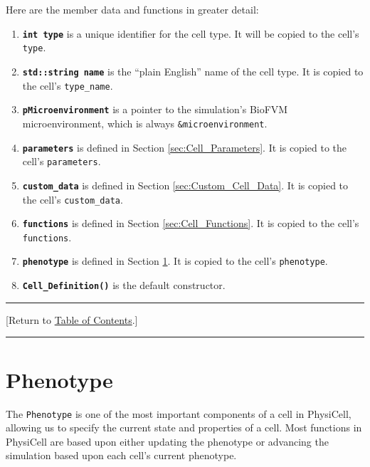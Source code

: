 \documentclass[12pt]{article}
\renewcommand{\v}{\verb}
\newcommand{\smallcode}[1]{\textbf{\texttt{#1}}}
\newcommand{\blue}[1]{\textcolor{blue}{#1}}
\newcommand{\DONE}{}%
\newcommand{\TOClink}{\begin{center}\hrule\vskip-5pt\phantom{.}\hfill[Return to \hyperlink{TOC}{Table of Contents}.]\hfill\phantom{.}\vskip3pt\hrule\end{center}}
\begin{document}
Here are the member data and functions in greater detail: 
\begin{enumerate}
\item
\smallcode{int type} is a unique identifier for the cell type. 
It will be copied to the cell's \v|type|. 

\item 
\smallcode{std::string name} is the ``plain English'' name of the 
cell type. It is copied to the cell's \v|type_name|. 

\item 
\smallcode{pMicroenvironment} is a pointer to the simulation's 
BioFVM microenvironment, which is always \v|&microenvironment|. 

\item 
\smallcode{parameters} is defined in Section 
\ref{sec:Cell_Parameters}.  It is copied to the cell's \v|parameters|. 

\item 
\smallcode{custom\_data} is defined in Section \ref{sec:Custom_Cell_Data}. 
It is copied to the cell's \v|custom_data|. 

\item 
\smallcode{functions} is defined in Section \ref{sec:Cell_Functions}. 
It is copied to the cell's \v|functions|. 

\item 
\smallcode{phenotype} is defined in Section \ref{sec:Phenotype}. It is 
copied to the cell's \v|phenotype|. 

\item
\smallcode{Cell\_Definition()} is the default constructor. 
\end{enumerate}

\TOClink 

\section{Phenotype \DONE}
\label{sec:Phenotype}
The \v|Phenotype| is one of the most important 
components of a cell in PhysiCell, allowing us to 
specify the current state and properties of a cell. 
Most functions in PhysiCell are based upon either updating 
the phenotype or advancing the simulation based upon each cell's 
current phenotype. 
\end{document}
